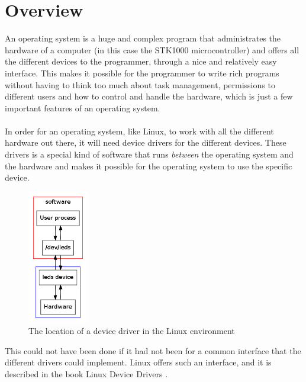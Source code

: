 \section{Overview}
An operating system is a huge and complex program that 
administrates the hardware of a computer (in this case the
STK1000 microcontroller) and offers all the different devices
to the programmer, through a nice and relatively easy interface. This makes 
it possible for the programmer to write rich
programs without having to think too much about task management,
permissions to different users and how to control and handle
the hardware, which is just a few important features of an
operating system.\\
\\
In order for an operating system, like Linux, 
to work with all the different hardware out there, it will need
device drivers for the different devices. These drivers is a 
special kind of software that runs \textit{between} the operating
system and the hardware and makes it possible
for the operating system to use the specific device.
\begin{figure}[h]
  \centerline{\includegraphics[width=100px]{graphics/device_driver.png}}
  \caption{The location of a device driver in the Linux environment}
  \label{device-driver}
\end{figure}
This could
not have been done if it had not been for a common interface that 
the different drivers could implement. Linux offers such an 
interface, and it is described in the book 
Linux Device Drivers \cite{linux-device-drivers}.\\
\\

